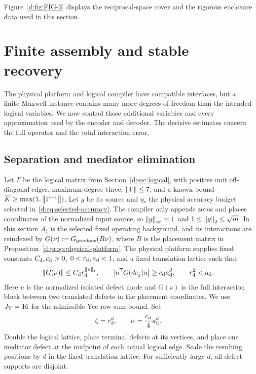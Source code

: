 Figure~\ref{d:fig:FIG-3} displays the reciprocal-space cover and the
rigorous enclosure data used in this section.

\section{Finite assembly and stable recovery}\label{d:sec:composition}

The physical platform and logical compiler have compatible interfaces, but a finite Maxwell instance contains many more degrees of freedom than the intended logical variables. We now control those additional variables and every approximation used by the encoder and decoder. The decisive estimates concern the full operator and the total interaction error.

\subsection{Separation and mediator elimination}

Let $\Gamma$ be the logical matrix from Section~\ref{d:sec:logical}, with positive unit off-diagonal edges, maximum degree three, $\left\lVert \Gamma\right\rVert\le7$, and a known bound $\overline K\ge\max(1,\left\lVert \Gamma^{-1}\right\rVert)$. Let $g$ be its source and $\eta_*$ the physical accuracy budget selected in~\eqref{d:eq:selected-accuracy}. The compiler only appends zeros and places coordinates of the normalized input source, so $\left\lVert g\right\rVert_\infty=1$ and $1\le\left\lVert g\right\rVert_2\le\sqrt m$. In this section $A_\xi$ is the selected fixed operating background, and its interactions are reindexed by $G(\nu):=G_{\rm previous}(B\nu)$, where $B$ is the placement matrix in Proposition~\ref{d:prop:physical-platform}. The physical platform supplies fixed constants $C_{\rm d},c_{\rm d}>0$, $0<r_{\rm d},a_{\rm d}<1$, and a fixed translation lattice such that
\begin{equation}\label{d:eq:composition-couplings}
 \left\lVert G(\nu)\right\rVert\le C_{\rm d}r_{\rm d}^{\left\lVert \nu\right\rVert_1},\qquad
 \left\lvert u^{\mathsf T}G(de_j)u\right\rvert\ge c_{\rm d}a_{\rm d}^d,\qquad r_{\rm d}^2<a_{\rm d}.
\end{equation}
Here $u$ is the normalized isolated defect mode and $G(\nu)$ is the full interaction block between two translated defects in the placement coordinates. We use $J_{\rm Y}=16$ for the admissible Yee row-sum bound. Set
\begin{equation}\label{d:eq:coupling-scales}
 \zeta=r_{\rm d}^d,\qquad \alpha=\frac {c_{\rm d}}4a_{\rm d}^d.
\end{equation}
Double the logical lattice, place terminal defects at its vertices, and place one mediator defect at the midpoint of each actual logical edge. Scale the resulting positions by $d$ in the fixed translation lattice. For sufficiently large $d$, all defect supports are disjoint.

